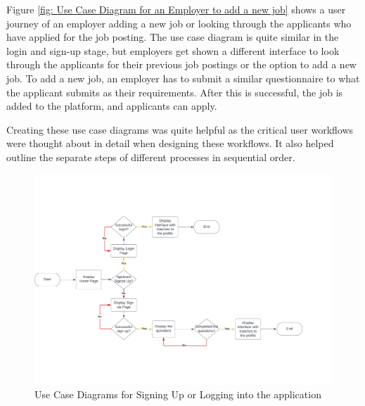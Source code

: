 Figure \ref{fig: Use Case Diagram for an Employer to add a new job} shows a user journey of an employer adding a new job or looking through the applicants who have applied for the job posting. The use case diagram is quite similar in the login and sign-up stage, but employers get shown a different interface to look through the applicants for their previous job postings or the option to add a new job. To add a new job, an employer has to submit a similar questionnaire to what the applicant submits as their requirements. After this is successful, the job is added to the platform, and applicants can apply.

Creating these use case diagrams was quite helpful as the critical user workflows were thought about in detail when designing these workflows. It also helped outline the separate steps of different processes in sequential order. 

\begin{figure}
    \noindent
    \centering
    \includegraphics[width = 140mm]{Figures/signup.pdf}
    \decoRule
    \caption[Use Case Diagrams for Signing Up or Logging into the application]{Use Case Diagrams for Signing Up or Logging into the application}
    \label{fig: Use Case Diagrams for Signing Up or Logging into the application}
\end{figure}

